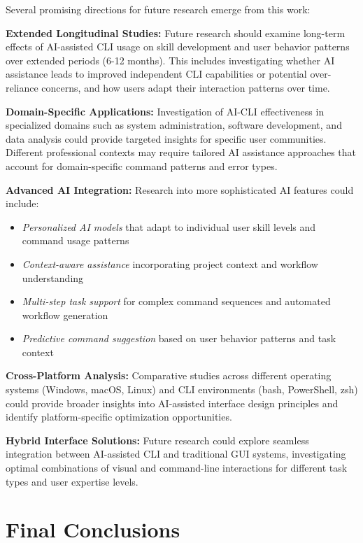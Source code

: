 Several promising directions for future research emerge from this work:

\textbf{Extended Longitudinal Studies:}
Future research should examine long-term effects of AI-assisted CLI usage on skill development and user behavior patterns over extended periods (6-12 months). This includes investigating whether AI assistance leads to improved independent CLI capabilities or potential over-reliance concerns, and how users adapt their interaction patterns over time.

\textbf{Domain-Specific Applications:}
Investigation of AI-CLI effectiveness in specialized domains such as system administration, software development, and data analysis could provide targeted insights for specific user communities. Different professional contexts may require tailored AI assistance approaches that account for domain-specific command patterns and error types.

\textbf{Advanced AI Integration:}
Research into more sophisticated AI features could include:
\begin{itemize}
	\item \textit{Personalized AI models} that adapt to individual user skill levels and command usage patterns
	\item \textit{Context-aware assistance} incorporating project context and workflow understanding
	\item \textit{Multi-step task support} for complex command sequences and automated workflow generation
	\item \textit{Predictive command suggestion} based on user behavior patterns and task context
\end{itemize}

\textbf{Cross-Platform Analysis:}
Comparative studies across different operating systems (Windows, macOS, Linux) and CLI environments (bash, PowerShell, zsh) could provide broader insights into AI-assisted interface design principles and identify platform-specific optimization opportunities.

\textbf{Hybrid Interface Solutions:}
Future research could explore seamless integration between AI-assisted CLI and traditional GUI systems, investigating optimal combinations of visual and command-line interactions for different task types and user expertise levels.

\section{Final Conclusions}

